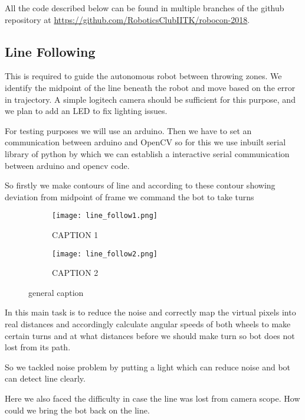 \documentclass[11pt]{article}
\begin{document}
All the code described below can be found in multiple branches of the github repository at \url{https://github.com/RoboticsClubIITK/robocon-2018}.

\subsection{Line Following}
This is required to guide the autonomous robot between throwing zones. We identify the midpoint of the line beneath the robot and move based on the error in trajectory. A simple logitech camera should be sufficient for this purpose, and we plan to add an LED to fix lighting issues.

For testing purposes we will use an arduino. Then we have to set an communication between arduino and OpenCV so for this we use inbuilt serial library of python by which we can establish a interactive serial communication between arduino and opencv code.

So firstly we make contours of line and according to these contour showing deviation from midpoint of frame we command the bot to take turns

    
\begin{figure}[!htb]
\centering
\begin{subfigure}{.5\textwidth}
  \centering
  \texttt{[image: line\_follow1.png]}
  \caption{CAPTION 1}
  \label{fig:sub1}
\end{subfigure}%
\begin{subfigure}{.5\textwidth}
  \centering
  \texttt{[image: line\_follow2.png]}
  \caption{CAPTION 2}
  \label{fig:sub2}
\end{subfigure}
\caption{general caption}
\label{fig:test}
\end{figure}

In this main task is to reduce the noise and correctly map the virtual pixels into real distances and accordingly calculate angular speeds of both wheels to make certain turns and at what distances before we should  make turn so bot does not lost from its path.

So we tackled noise problem by putting a light which can reduce noise and bot can detect line clearly.

Here we also faced the difficulty in case the line was lost from camera scope. How could we bring the bot back on the line.
\end{document}
